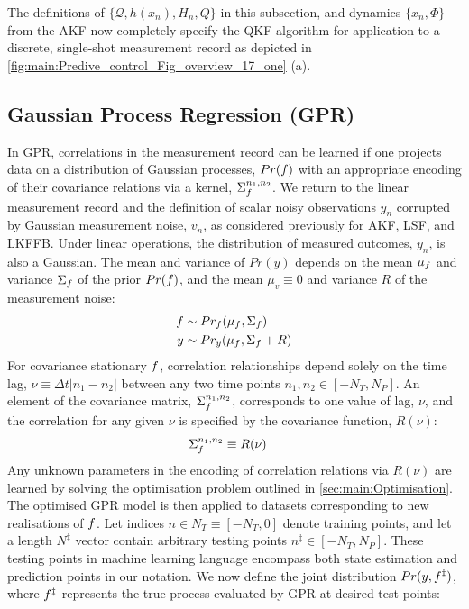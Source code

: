 The definitions of $\{ \mathcal{Q}, h(x_n), H_n, Q \}$ in this subsection, and dynamics $\{x_n, \Phi\}$ from the AKF now completely specify the QKF algorithm for application to a discrete, single-shot measurement record as depicted in \cref{fig:main:Predive_control_Fig_overview_17_one} (a).  

\subsection{Gaussian Process Regression (GPR)}

In GPR, correlations in the measurement record can be learned if one projects data on a distribution of Gaussian processes, $Pr(f)$ with an appropriate encoding of their covariance relations via a kernel, $\Sigma_f^{n_1, n_2}$. We return to the linear measurement record and the definition of scalar noisy observations $y_{n}$ corrupted by Gaussian measurement noise, $v_n$, as considered previously for AKF, LSF, and LKFFB.  
Under linear operations, the distribution of measured outcomes, $y_n$, is also a Gaussian. The  mean and variance of $Pr(y)$  depends on the mean $\mu_f$ and variance $\Sigma_f$ of the prior $Pr(f)$, and the mean $\mu_v \equiv 0$ and variance $R$ of the measurement noise: 
\begin{align}
	f & \sim Pr_f(\mu_f,\Sigma_f ) \\
	y & \sim Pr_y(\mu_f,\Sigma_f + R ) 
\end{align}
For covariance stationary $f$, correlation relationships depend solely on the time lag, $\nu \equiv \Delta t|n_1 - n_2|$ between any two time points  $n_1, n_2 \in [-N_T, N_P]$.  An element of the covariance matrix, $\Sigma_f^{n_1,n_2}$, corresponds to one value of lag, $\nu$, and the correlation for any given $\nu$  is specified by the covariance function, $R(\nu)$:
\begin{align}
	\Sigma_f^{n_1,n_2} & \equiv R(\nu) 
\end{align}
Any unknown parameters in the encoding of correlation relations via $R(\nu)$ are learned by solving the optimisation problem outlined in \cref{sec:main:Optimisation}. The optimised GPR model is then applied to datasets corresponding to new realisations of $f$. Let indices $n \in N_T \equiv [-N_T, 0]$ denote training points, and let a length $N^{\ddagger} $ vector contain arbitrary testing points $n^{\ddagger} \in [-N_T, N_P]$. These testing points in machine learning language encompass both state estimation and prediction points in our notation. We now define the joint distribution $Pr(y,f^{\ddagger})$, where $f^{\ddagger}$ represents the true process evaluated by GPR at desired test points: 
